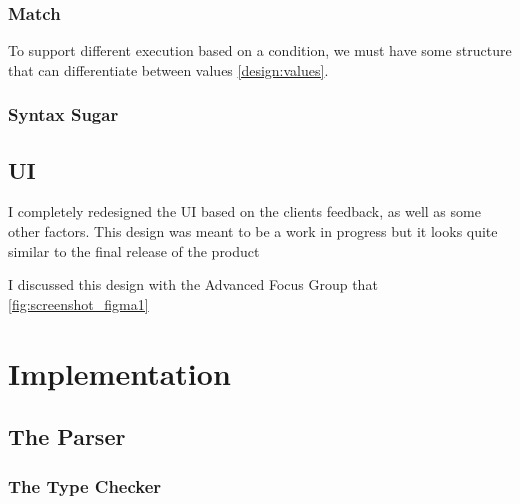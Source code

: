 \subsubsection{Match}
To support different execution based on a condition, we must have some structure that can differentiate between values \ref{design:values}. 

\subsubsection{Syntax Sugar}

\subsection{UI}
I completely redesigned the UI based on the clients feedback, as well as some other factors. This design was meant to be a work in progress but it looks quite similar to the final release of the product

I discussed this design with the Advanced Focus Group that 
\ref{fig:screenshot_figma1}

\section{Implementation}
\subsection{The Parser}

\subsubsection{The Type Checker}
